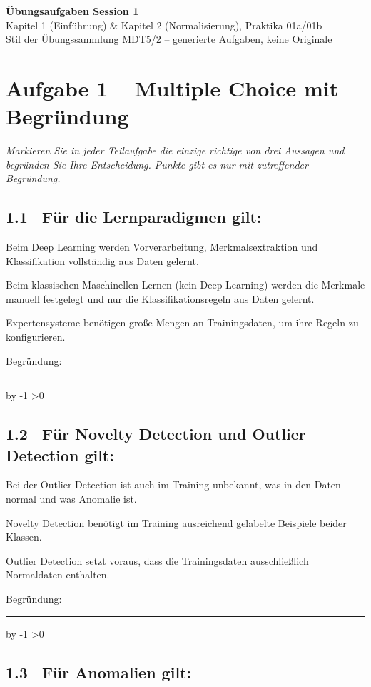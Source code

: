 \documentclass[10pt,a4paper]{article}
\newcommand{\mcbox}{\raisebox{-1pt}{\fbox{\rule{0pt}{7pt}\rule{7pt}{0pt}}}\hspace{6pt}}
\newcommand{\antwortlinien}[1]{%
  \par\vspace{2pt}%
  \newcount\zeilen \zeilen=#1
  \loop
    \noindent\rule{\linewidth}{0.4pt}\par\vspace{11pt}%
    \advance\zeilen by -1
  \ifnum\zeilen>0 \repeat
}
\begin{document}
\begin{center}
  {\Large\bfseries Übungsaufgaben Session 1}\\[4pt]
  {\large Kapitel 1 (Einführung) \& Kapitel 2 (Normalisierung), Praktika 01a/01b}\\[4pt]
  \small Stil der Übungssammlung MDT5/2 -- generierte Aufgaben, keine Originale
\end{center}

\vspace{4pt}

\section*{Aufgabe 1 -- Multiple Choice mit Begründung}

\emph{Markieren Sie in jeder Teilaufgabe die einzige richtige von drei Aussagen und begründen Sie Ihre
Entscheidung. Punkte gibt es nur mit zutreffender Begründung.}

\subsection*{1.1 \ Für die Lernparadigmen gilt:}

\mcbox Beim Deep Learning werden Vorverarbeitung, Merkmalsextraktion und Klassifikation
vollständig aus Daten gelernt.

\mcbox Beim klassischen Maschinellen Lernen (kein Deep Learning) werden die Merkmale manuell
festgelegt und nur die Klassifikationsregeln aus Daten gelernt.

\mcbox Expertensysteme benötigen große Mengen an Trainingsdaten, um ihre Regeln zu konfigurieren.

Begründung:
\antwortlinien{2}

\subsection*{1.2 \ Für Novelty Detection und Outlier Detection gilt:}

\mcbox Bei der Outlier Detection ist auch im Training unbekannt, was in den Daten normal und
was Anomalie ist.

\mcbox Novelty Detection benötigt im Training ausreichend gelabelte Beispiele beider Klassen.

\mcbox Outlier Detection setzt voraus, dass die Trainingsdaten ausschließlich Normaldaten enthalten.

Begründung:
\antwortlinien{2}

\subsection*{1.3 \ Für Anomalien gilt:}
\end{document}
